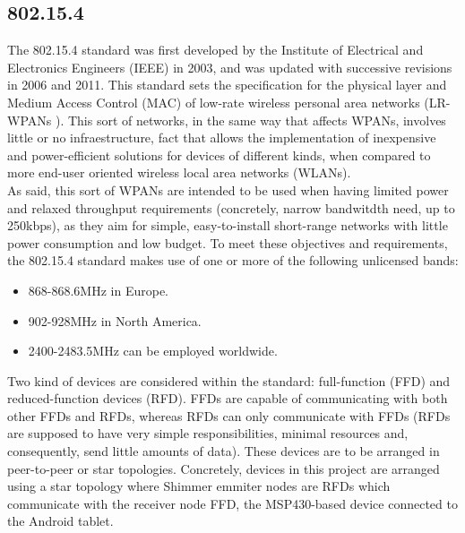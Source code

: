 		\subsection{802.15.4}
		\label{ssec:802.15.4}
			The 802.15.4 standard \cite{802.15.4} was first developed by the Institute of Electrical and
			Electronics Engineers (IEEE) in 2003, and was updated with successive revisions in 2006 and 2011.
			This standard sets the specification for the physical layer and Medium Access Control (MAC) of 
			low-rate wireless personal area networks (LR-WPANs \cite[p. 13]{802.15.4}). This sort of networks,
			in the same way that affects WPANs, involves little or no infraestructure, fact that allows the
			implementation of inexpensive and power-efficient solutions for devices of different kinds, when
			compared to more end-user oriented wireless local area networks (WLANs).\\

			As said, this sort of WPANs are intended to be used when having limited power and relaxed throughput
			requirements (concretely, narrow bandwitdth need, up to 250kbps), as they aim for simple,
			easy-to-install short-range networks with little power consumption and low budget. To meet these
			objectives and requirements, the 802.15.4 standard makes use of one or more of the following
			unlicensed bands:

			\begin{itemize}
				\item 868-868.6MHz in Europe.
				\item 902-928MHz in North America.
				\item 2400-2483.5MHz can be employed worldwide.
			\end{itemize}

			Two kind of devices are considered within the standard: full-function (FFD) and reduced-function
			devices (RFD). FFDs are capable of communicating with both other FFDs and RFDs, whereas RFDs can only
			communicate with FFDs (RFDs are supposed to have very simple responsibilities, minimal resources and,
			consequently, send little amounts of data). These devices are to be arranged in peer-to-peer or star
			topologies. Concretely, devices in this project are arranged using a star topology where Shimmer
			emmiter nodes are RFDs which communicate with the receiver node FFD, the MSP430-based device
			connected to the Android tablet.\\

